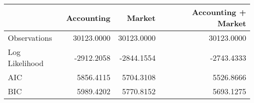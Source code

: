 \begin{tabular}{lrrr}
\toprule
 & Accounting & Market & Accounting + Market \\
\midrule
Observations & 30123.0000 & 30123.0000 & 30123.0000 \\
Log Likelihood & -2912.2058 & -2844.1554 & -2743.4333 \\
AIC & 5856.4115 & 5704.3108 & 5526.8666 \\
BIC & 5989.4202 & 5770.8152 & 5693.1275 \\
\bottomrule
\end{tabular}
